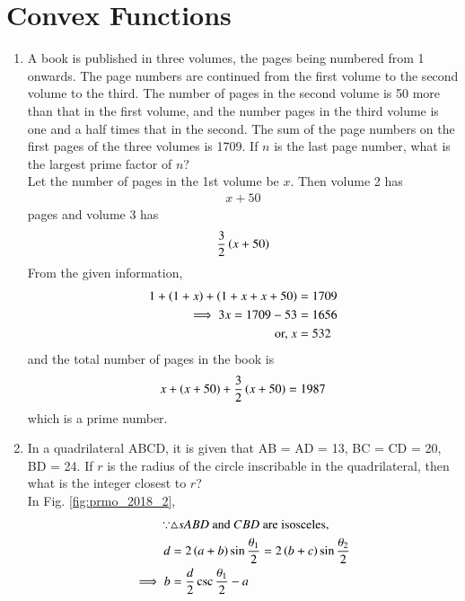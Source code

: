 \documentclass[journal,12pt,twocolumn]{IEEEtran}
\renewcommand\thesection{\arabic{section}}
\begin{document}
\section{Convex Functions}

\begin{enumerate}[label=\thesection.\arabic*,ref=\thesection.\theenumi]

\item A book is published in three volumes, the pages being numbered from 1 onwards. The page numbers are continued from the first volume to the second volume to the third. The number of pages in the second volume is 50 more than that in the first volume, and the number pages in the third volume is one and a half times that in the second. The sum of the page numbers on the first pages of the three volumes is 1709. If $n$ is the last page number, what is the largest prime factor of $n$?
\\
\solution Let the number of pages in the 1st volume be $x$. Then volume 2 has
\begin{align}
x+50
\end{align}
pages and volume 3 has 
\begin{align}
\frac{3}{2}\left(x+50\right)
\end{align}
From the given information, 
\begin{align}
1 + \left(1+x\right) + \left(1+x+x+50\right) &= 1709
\\
\implies 3x =  1709-53 &= 1656
\\
\text{or, } x  &= 532
\end{align}
%
and the total number of pages in the book is 
\begin{align}
x + \left(x+50\right)+\frac{3}{2}\left(x+50\right) = 1987
\end{align}
%
which is a prime number.
\item In a quadrilateral ABCD, it is given that AB = AD = 13, BC = CD = 20, BD = 24. If $r$ is the radius of the circle inscribable in the quadrilateral, then what is the integer closest to $r$? 
\\
\solution In Fig. \ref{fig:prmo_2018_2},
%
\begin{align}
\because &\triangle s ABD \text{ and } CBD \text{ are isosceles},
\\
d &= 2\brak{a+b}\sin \frac{\theta_1}{2} =2\brak{b+c}\sin \frac{\theta_2}{2}
\\
\implies b &= \frac{d}{2} \csc \frac{\theta_1}{2} -a 

\end{align}
\end{enumerate}
\end{document}
